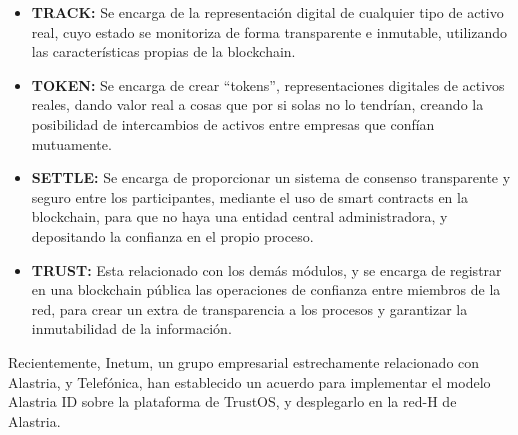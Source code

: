 \begin{itemize}
    \item \textbf{TRACK:} Se encarga de la representación digital de cualquier tipo de activo real, cuyo estado se monitoriza de forma transparente e inmutable, utilizando las características propias de la blockchain.
    \item \textbf{TOKEN:} Se encarga de crear ``tokens'', representaciones digitales de activos reales, dando valor real a cosas que por si solas no lo tendrían, creando la posibilidad de intercambios de activos entre empresas que confían mutuamente.
    \item \textbf{SETTLE:} Se encarga de proporcionar un sistema de consenso transparente y seguro entre los participantes, mediante el uso de smart contracts en la blockchain, para que no haya una entidad central administradora, y depositando la confianza en el propio proceso.
    \item \textbf{TRUST:} Esta relacionado con los demás módulos, y se encarga de registrar en una blockchain pública las operaciones de confianza entre miembros de la red, para crear un extra de transparencia a los procesos y garantizar la inmutabilidad de la información.
\end{itemize}
Recientemente, Inetum, un grupo empresarial estrechamente relacionado con Alastria, y Telefónica, han establecido un acuerdo para implementar el modelo Alastria ID sobre la plataforma de TrustOS, y desplegarlo en la red-H de Alastria.